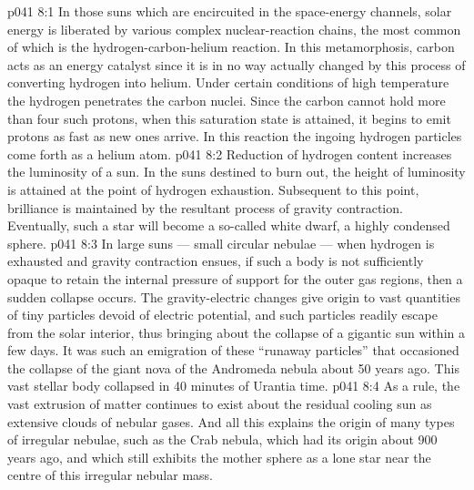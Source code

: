 \vs p041 8:1 In those suns which are encircuited in the space\hyp{}energy channels, solar energy is liberated by various complex nuclear\hyp{}reaction chains, the most common of which is the hydrogen\hyp{}carbon\hyp{}helium reaction. In this metamorphosis, carbon acts as an energy catalyst since it is in no way actually changed by this process of converting hydrogen into helium. Under certain conditions of high temperature the hydrogen penetrates the carbon nuclei. Since the carbon cannot hold more than four such protons, when this saturation state is attained, it begins to emit protons as fast as new ones arrive. In this reaction the ingoing hydrogen particles come forth as a helium atom.
\vs p041 8:2 \pc Reduction of hydrogen content increases the luminosity of a sun. In the suns destined to burn out, the height of luminosity is attained at the point of hydrogen exhaustion. Subsequent to this point, brilliance is maintained by the resultant process of gravity contraction. Eventually, such a star will become a so\hyp{}called white dwarf, a highly condensed sphere.
\vs p041 8:3 \pc In large suns --- small circular nebulae --- when hydrogen is exhausted and gravity contraction ensues, if such a body is not sufficiently opaque to retain the internal pressure of support for the outer gas regions, then a sudden collapse occurs. The gravity\hyp{}electric changes give origin to vast quantities of tiny particles devoid of electric potential, and such particles readily escape from the solar interior, thus bringing about the collapse of a gigantic sun within a few days. It was such an emigration of these “runaway particles” that occasioned the collapse of the giant nova of the Andromeda nebula about 50 years ago. This vast stellar body collapsed in 40 minutes of Urantia time.
\vs p041 8:4 As a rule, the vast extrusion of matter continues to exist about the residual cooling sun as extensive clouds of nebular gases. And all this explains the origin of many types of irregular nebulae, such as the Crab nebula, which had its origin about 900 years ago, and which still exhibits the mother sphere as a lone star near the centre of this irregular nebular mass.
